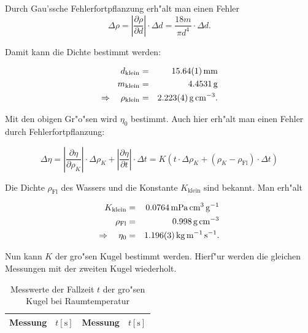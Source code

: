 		Durch Gau'ssche Fehlerfortpflanzung erh"alt man einen Fehler 
		\begin{equation*}
			\Delta \rho = \left| \frac{\partial \rho}{\partial d} \right| \cdot \Delta d = \frac{18m}{\pi d^4} \cdot \Delta d .
		\end{equation*}

		Damit kann die Dichte bestimmt werden:

		\begin{eqnarray*}
			d_\mathrm{klein} & = & \SI{15.64 (1)}{\milli \meter} \\ 
			m_\mathrm{klein} & = & \SI{4.4531}{\gram} \\
			\Rightarrow \quad \rho_\mathrm{klein} & = & \SI{2.223 (4)}{\gram \per \centi \meter \cubed} .
		\end{eqnarray*}

		Mit den obigen Gr"o"sen wird $\eta_0$ bestimmt.
		Auch hier erh"alt man einen Fehler durch Fehlerfortpflanzung:

		\begin{equation*}
			\Delta \eta = \left| \frac{\partial \eta}{\partial \rho_K} \right| \cdot \Delta \rho_K + \left| \frac{\partial \eta}{\partial t} \right| \cdot \Delta t = K \left(t \cdot \Delta \rho_K + \left(\rho_K - \rho_\mathrm{Fl}\right) \cdot \Delta t \right)
		\end{equation*}

		Die Dichte $\rho_\mathrm{Fl}$ des Wassers und die Konstante $K_\mathrm{klein}$ sind bekannt. Man erh"alt

		\begin{eqnarray*}
			K_\mathrm{klein} & = & \SI{.0764}{\milli \pascal \centi \meter \cubed \per \gram} \\
			\rho_\mathrm{Fl} & = & \SI{.998}{\gram \per \centi \meter \cubed}\\
			\Rightarrow \quad \eta_0 & = & \SI{1.196 (3)}{\kilo \gram \per \meter \per \second} .
		\end{eqnarray*}

		Nun kann $K$ der gro"sen Kugel bestimmt werden.
		Hierf"ur werden die gleichen Messungen mit der zweiten Kugel wiederholt.

		\begin{table}[h!]
			\centering
			\caption{Messwerte der Fallzeit $t$ der gro"sen Kugel bei Raumtemperatur}
			\begin{tabular}{|c|c||c|c|}
				\hline
				Messung & $t [\mathrm{s}]$ & Messung & $t [\mathrm{s}]$ \\
				\hline
				\hline
				
				\hline
			\end{tabular}
		\end{table}

